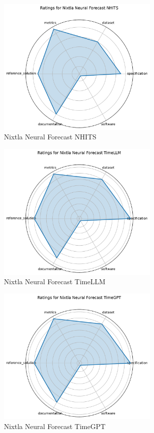 \documentclass{article}
\begin{document}
\begin{figure}[h!]
  \centering
  \includegraphics[width=0.7\textwidth]{Nixtla Neural Forecast NHITS_radar.pdf}
  \caption{Nixtla Neural Forecast NHITS}
\end{figure}

\begin{figure}[h!]
  \centering
  \includegraphics[width=0.7\textwidth]{Nixtla Neural Forecast TimeLLM_radar.pdf}
  \caption{Nixtla Neural Forecast TimeLLM}
\end{figure}

\begin{figure}[h!]
  \centering
  \includegraphics[width=0.7\textwidth]{Nixtla Neural Forecast TimeGPT_radar.pdf}
  \caption{Nixtla Neural Forecast TimeGPT}
\end{figure}
\end{document}
